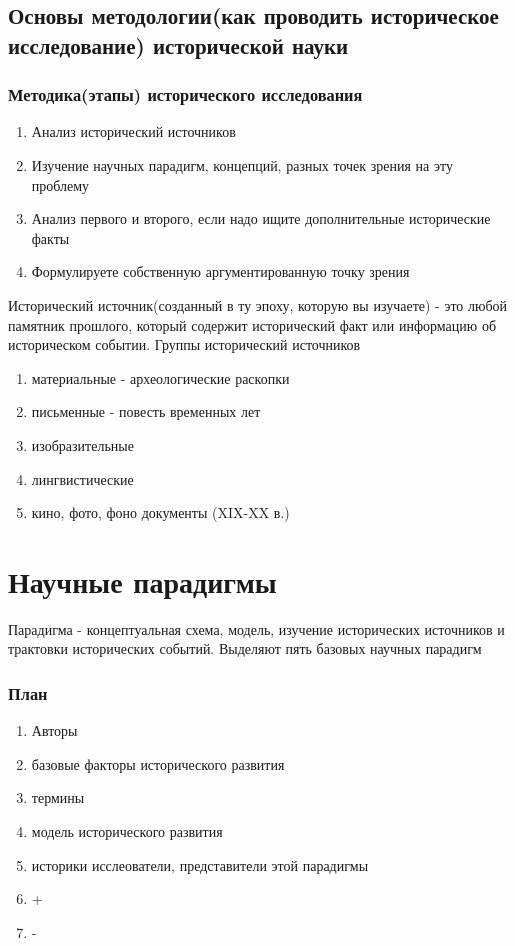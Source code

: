 \documentclass[a4paper]{article}
\begin{document}
\subsection{Основы методологии(как проводить историческое исследование)
 исторической науки}

\subsubsection{Методика(этапы) исторического исследования}

\begin{enumerate}
\item Анализ исторический источников
\item Изучение научных парадигм, концепций, разных точек зрения на эту проблему
\item Анализ первого и второго, если надо ищите дополнительные исторические факты
\item Формулируете собственную аргументированную точку зрения
\end{enumerate}

Исторический источник(созданный в ту эпоху, которую вы изучаете) - это любой памятник прошлого, который содержит исторический факт или информацию об историческом событии.
Группы исторический источников

\begin{enumerate}
\item материальные - археологические раскопки
\item письменные - повесть временных лет
\item изобразительные
\item лингвистические
\item кино, фото, фоно документы (XIX-XX в.)
\end{enumerate}

\section{Научные парадигмы}
Парадигма - концептуальная схема, модель, изучение исторических источников и трактовки исторических событий.
Выделяют пять базовых научных парадигм

\subsubsection{План}
\begin{enumerate}
\item Авторы
\item базовые факторы исторического развития
\item термины
\item модель исторического развития
\item историки исслеователи, представители этой парадигмы
\item +
\item - 

\end{enumerate}
\end{document}
